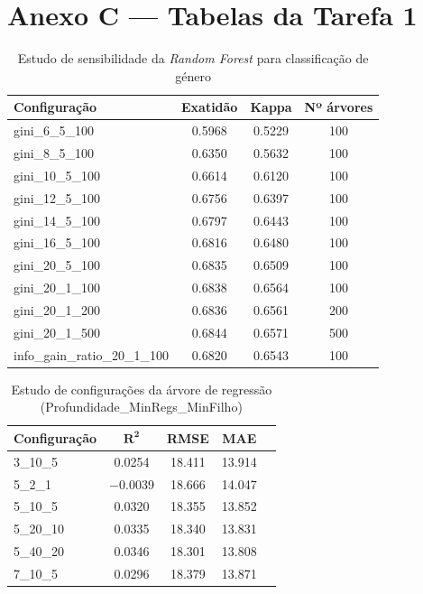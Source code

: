 \documentclass[11pt,a4paper]{article}
\begin{document}
\section{Anexo C — Tabelas da Tarefa 1}

\begin{table}[H]
\centering
\caption{Estudo de sensibilidade da \textit{Random Forest} para classificação de género}
\label{tab:rf_sensibilidade}
\begin{tabular}{lccc}
\toprule
\textbf{Configuração} & \textbf{Exatidão} & \textbf{Kappa} & \textbf{Nº árvores}\\
\midrule
gini\_6\_5\_100 & 0.5968 & 0.5229 & 100\\
gini\_8\_5\_100 & 0.6350 & 0.5632 & 100\\
gini\_10\_5\_100 & 0.6614 & 0.6120 & 100\\
gini\_12\_5\_100 & 0.6756 & 0.6397 & 100\\
gini\_14\_5\_100 & 0.6797 & 0.6443 & 100\\
gini\_16\_5\_100 & 0.6816 & 0.6480 & 100\\
gini\_20\_5\_100 & 0.6835 & 0.6509 & 100\\
gini\_20\_1\_100 & 0.6838 & 0.6564 & 100\\
gini\_20\_1\_200 & 0.6836 & 0.6561 & 200\\
gini\_20\_1\_500 & 0.6844 & 0.6571 & 500\\
info\_gain\_ratio\_20\_1\_100 & 0.6820 & 0.6543 & 100\\
\bottomrule
\end{tabular}
\end{table}

\begin{table}[H]
\centering
\caption{Estudo de configurações da árvore de regressão (Profundidade\_MinRegs\_MinFilho)}
\label{tab:arvore_reg}
\begin{tabular}{lcccc}
\toprule
\textbf{Configuração} & $\mathbf{R^2}$ & \textbf{RMSE} & \textbf{MAE}\\
\midrule
3\_10\_5 & 0.0254 & 18.411 & 13.914\\
5\_2\_1 & $-$0.0039 & 18.666 & 14.047\\
5\_10\_5 & 0.0320 & 18.355 & 13.852\\
5\_20\_10 & 0.0335 & 18.340 & 13.831\\
5\_40\_20 & 0.0346 & 18.301 & 13.808\\
7\_10\_5 & 0.0296 & 18.379 & 13.871\\
\bottomrule
\end{tabular}
\end{table}
\end{document}
